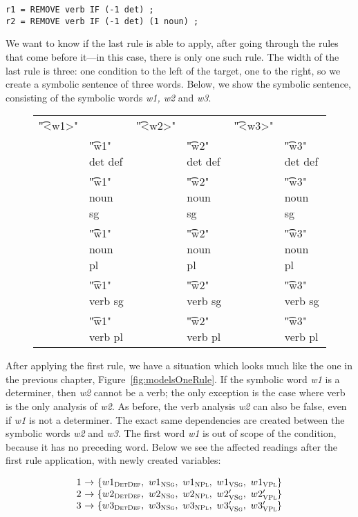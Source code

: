 \begin{verbatim}
r1 = REMOVE verb IF (-1 det) ;
r2 = REMOVE verb IF (-1 det) (1 noun) ;
\end{verbatim}


We want to know if the last rule is able to apply, after going through the rules that come before it---in this case, there is only one such rule. 
The width of the last rule is three: one condition to the left of the target, one to the right, so we create a symbolic sentence of three words. Below, we show the symbolic sentence, consisting of the symbolic words {\em w1, w2} and {\em w3}.

\begin{figure}[h]
\centering
\begin{tabular}{p{0.6cm} l  p{0.6cm} l p{0.6cm} l }
\t{"<w1>"}    &                     &  \t{"<w2>"}  &           &  \t{"<w3>"}    \\
              & \t{"w1" det def}    & &      \t{"w2" det def}  & &  \t{"w3" det def} \\
              & \t{"w1" noun sg}    & &      \t{"w2" noun sg}  & &  \t{"w3" noun sg} \\
              & \t{"w1" noun pl}    & &      \t{"w2" noun pl}  & &  \t{"w3" noun pl} \\
              & \t{"w1" verb sg}    & &      \t{"w2" verb sg}  & &  \t{"w3" verb sg} \\
              & \t{"w1" verb pl}    & &      \t{"w2" verb pl}  & &  \t{"w3" verb pl} \\
\end{tabular}
\end{figure}

After applying the first rule, we have a situation which looks much like the one in the previous chapter, Figure~\ref{fig:modelsOneRule}. 
If the symbolic word {\em w1} is a determiner, then {\em w2} cannot be a verb; 
the only exception is the case where verb is the only analysis of {\em w2}. 
As before, the verb analysis {\em w2} can also be false, even if {\em w1} 
is not a determiner. The exact same dependencies are created between the 
symbolic words {\em w2} and {\em w3}.
The first word {\em w1} is out of scope of the condition, because it has no preceding word. 
Below we see the affected readings after the first rule application, with newly created variables:

\begin{figure}[h]
$$\begin{array}{l @{~\rightarrow~} l}
1 & \{w1_{\detdef}, \  w1_{\noun\sg}, \  w1_{\noun\pl}, \ w1_{\verb\sg}, \ w1_{\verb\pl} \} \\
2 & \{w2_{\detdef}, \  w2_{\noun\sg}, \  w2_{\noun\pl}, \ w2'_{\verb\sg}, \ w2'_{\verb\pl} \} \\
3 & \{w3_{\detdef}, \  w3_{\noun\sg}, \  w3_{\noun\pl}, \ w3'_{\verb\sg}, \ w3'_{\verb\pl} \} \\
\end{array}$$
\end{figure}

